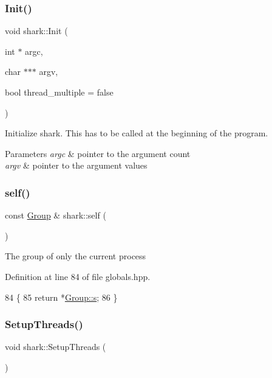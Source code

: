 \subsubsection{\texorpdfstring{Init()}{Init()}}
{\footnotesize\ttfamily void shark\+::\+Init (\begin{DoxyParamCaption}\item[{int $\ast$}]{argc,  }\item[{char $\ast$$\ast$$\ast$}]{argv,  }\item[{bool}]{thread\+\_\+multiple = {\ttfamily false} }\end{DoxyParamCaption})}

Initialize shark. This has to be called at the beginning of the program. 
\begin{DoxyParams}{Parameters}
{\em argc} & pointer to the argument count \\
\hline
{\em argv} & pointer to the argument values \\
\hline
\end{DoxyParams}
\hypertarget{namespaceshark_a48a395947ef400bc057cebb8150f7f4e}{}\label{namespaceshark_a48a395947ef400bc057cebb8150f7f4e} 
\subsubsection{\texorpdfstring{self()}{self()}}
{\footnotesize\ttfamily const \hyperlink{classshark_1_1_group}{Group} \& shark\+::self (\begin{DoxyParamCaption}{ }\end{DoxyParamCaption})\hspace{0.3cm}{\ttfamily [inline]}}

The group of only the current process 

Definition at line 84 of file globals.\+hpp.


\begin{DoxyCode}
84                                \{
85         \textcolor{keywordflow}{return} *\hyperlink{classshark_1_1_group_a6c59f34c15be2873372cd006c2939da2}{Group::s};
86     \}
\end{DoxyCode}
\hypertarget{namespaceshark_aa4284bb4a0880374f13b0928c18d2143}{}\label{namespaceshark_aa4284bb4a0880374f13b0928c18d2143} 
\subsubsection{\texorpdfstring{Setup\+Threads()}{SetupThreads()}}
{\footnotesize\ttfamily void shark\+::\+Setup\+Threads (\begin{DoxyParamCaption}{ }\end{DoxyParamCaption})}

